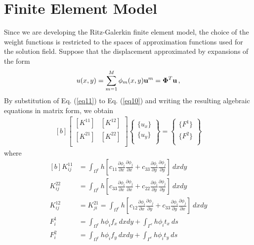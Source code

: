 \documentclass[]{article}
\begin{document}
\section{Finite Element Model} \label{sec: fem}
Since we are developing the Ritz-Galerkin finite element model, the choice of the weight functions is restricted to the spaces of approximation functions used for the solution field. Suppose that the displacement approximated by expansions of the form
\begin{equation}\label{eq11}
	\begin{aligned}
		u(x,y)= \sum_{m=1}^{M} \phi_m(x,y) \mathbf{u}^m= \boldsymbol{\Phi}^T\mathbf{u} \thinspace,
	\end{aligned}
\end{equation}
By substitution of Eq. (\ref{eq11}) to Eq. (\ref{eq10}) and writing the resulting algebraic equations in matrix form, we obtain
\begin{equation}\label{eq12}
	\begin{aligned}[b]
		\begin{bmatrix}
			[K^{11}] & [K^{12}]\\
			[K^{21}] & [K^{22}]\\
		\end{bmatrix}
		\begin{Bmatrix}
			\{u_x\}\\
			\{u_y\}\\
		\end{Bmatrix}
		= \begin{Bmatrix}
			\{F^1\}\\
			\{F^2\}\\
		\end{Bmatrix}
	\end{aligned}
\end{equation}
where
\begin{equation}\label{eq13}
	\begin{aligned}[b]
		K^{11}_{ij} &= \int_{\Omega^e} h \left[c_{11}\frac{\partial \phi_i}{\partial x}\frac{\partial \phi_j}{\partial x} +c_{33}\frac{\partial \phi_i}{\partial y}\frac{\partial \phi_j}{\partial y}\right]  \ dxdy\\
		K^{22}_{ij} &= \int_{\Omega^e} h \left[c_{33}\frac{\partial \phi_i}{\partial x}\frac{\partial \phi_j}{\partial x} +c_{22}\frac{\partial \phi_i}{\partial y}\frac{\partial \phi_j}{\partial y}\right]  \ dxdy\\
		K^{12}_{ij} &= K^{21}_{ji} = \int_{\Omega^e} h \left[c_{12}\frac{\partial \phi_i}{\partial x}\frac{\partial \phi_j}{\partial y} +c_{33}\frac{\partial \phi_i}{\partial y}\frac{\partial \phi_j}{\partial x}\right]  \ dxdy\\
		F^{1}_{i} &= \int_{\Omega^e} h \phi_i f_x \ dxdy +\int_{\Gamma^e} h \phi_i t_x \ ds\\
		F^{2}_{i} &= \int_{\Omega^e} h \phi_i f_y \ dxdy +\int_{\Gamma^e} h \phi_i t_y \ ds\\
	\end{aligned}
\end{equation}
\end{document}
